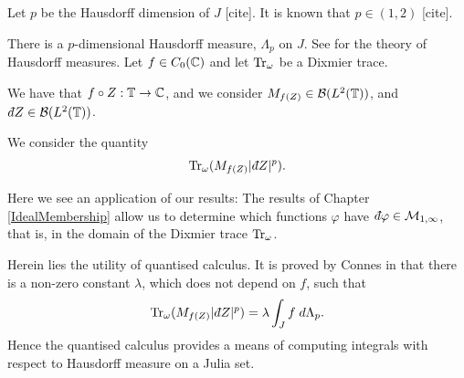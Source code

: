 Let $p$ be the Hausdorff dimension of $J$ [cite]. It is known that $p \in (1,2)$ [cite].

There is a $p$-dimensional Hausdorff measure, $\Lambda_p$ on $J$. See \cite{rogers1998hausdorff} for the theory
of Hausdorff measures.
Let
$f\in C_0(\mathbb{C})$ and let $\operatorname{Tr}_\omega$
be a Dixmier trace. 

We have that $f\circ Z :\mathbb{T}\to \mathbb{C}$, and we consider $M_{f(Z)} \in \mathcal{B}(L^2(\mathbb{T}))$,
and $\qd Z \in \mathcal{B}(L^2(\Circ))$.

We consider the quantity
\begin{equation}
    \Tr_\omega(M_{f(Z)}|\qd Z|^p).
\end{equation}


Here we see an application of our results: The results of Chapter \ref{IdealMembership}
allow us to determine which functions $\varphi$ have $\qd \varphi\in \M_{1,\infty}$,
that is, in the domain of the Dixmier trace $\operatorname{Tr}_\omega$.

Herein lies the utility
of quantised calculus.
It is proved by Connes in \cite[Ch. 4, Thm 17]{Connes94} that there is a non-zero constant $\lambda$,
which does not depend on $f$, such that
\begin{equation}
    \Tr_\omega(M_{f(Z)}|\qd Z|^p) = \lambda \int_J f\;d\Lambda_p.
\end{equation}
Hence the quantised calculus provides a means of computing integrals
with respect to Hausdorff measure on a Julia set.
